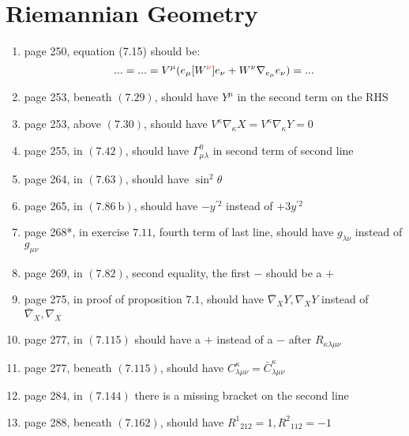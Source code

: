 \documentclass{article}
\newcommand\Dag{\textsuperscript{\dagger}}
\begin{document}
\section*{Riemannian Geometry}

\begin{enumerate}
\item page 250\Dag, equation (7.15) should be:
  \[... = ... = V^\mu(e_\mu[W^{\color{red} \nu}]e_\nu+W^\nu\nabla_{e_\mu}e_\nu) = ...\]
  
\item page 253, beneath $(7.29)$, should have $Y^{\mu}$ in the second term on the $\mathrm{RHS}$

\item page 253, above $(7.30)$, should have $V^{\kappa} \nabla_{\kappa} X=V^{\kappa} \nabla_{\kappa} Y=0$

\item page 255, in $(7.42)$, should have $\Gamma_{\mu \lambda}^{\eta}$ in second term of second line

\item page 264, in $(7.63)$, should have $\sin ^{2} \theta$

\item page 265, in $(7.86 \mathrm{~b})$, should have $-y^{\prime 2}$ instead of $+3 y^{\prime 2}$

\item page 268*, in exercise $7.11$, fourth term of last line, should have $g_{\lambda \nu}$ instead of $g_{\mu \nu}$

\item page 269, in $(7.82)$, second equality, the first $-$ should be a $+$

\item page 275, in proof of proposition $7.1$, should have $\bar{\nabla}_{X} Y, \nabla_{X} Y$ instead of $\bar{\nabla}_{X}, \nabla_{X}$

\item page 277, in $(7.115)$ should have a $+$ instead of a $-$ after $R_{\kappa \lambda \mu \nu}$

\item page 277, beneath $(7.115)$, should have $C^{\kappa} _{\lambda \mu \nu}=\bar{C}^{\kappa} _{\lambda \mu \nu}$

\item page 284, in $(7.144)$ there is a missing bracket on the second line

\item page 288, beneath $(7.162)$, should have $R^{1}{}_{212}=1, R^{2}{}_{112}=-1$


\end{enumerate}
\end{document}
